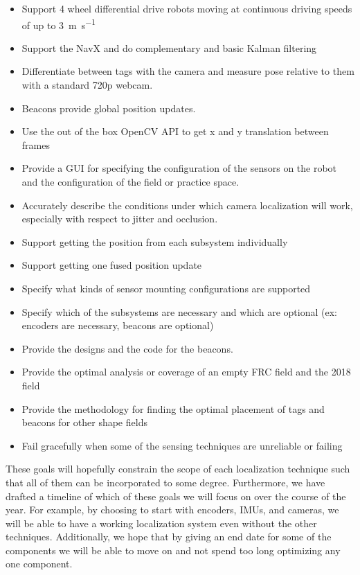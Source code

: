 \documentclass{article}
\begin{document}
    \begin{itemize}
      \item Support 4 wheel differential drive robots moving at continuous driving speeds of up to \SI{3}{\meter\per\second}
      \item Support the NavX and do complementary and basic Kalman filtering
      \item Differentiate between tags with the camera and measure pose relative to them with a standard 720p webcam.
      \item Beacons provide global position updates.
      \item Use the out of the box OpenCV API to get x and y translation between frames
      \item Provide a GUI for specifying the configuration of the sensors on the robot and the configuration of the field or practice space.
      \item Accurately describe the conditions under which camera localization will work, especially with respect to jitter and occlusion.
      \item Support getting the position from each subsystem individually
      \item Support getting one fused position update
      \item Specify what kinds of sensor mounting configurations are supported
      \item Specify which of the subsystems are necessary and which are optional (ex: encoders are necessary, beacons are optional)
      \item Provide the designs and the code for the beacons.
      \item Provide the optimal analysis or coverage of an empty FRC field and the 2018 field
      \item Provide the methodology for finding the optimal placement of tags and beacons for other shape fields
      \item Fail gracefully when some of the sensing techniques are unreliable or failing
    \end{itemize}

    These goals will hopefully constrain the scope of each localization technique such that all of them can be incorporated to some degree. Furthermore, we have drafted a timeline of which of these goals we will focus on over the course of the year. For example, by choosing to start with encoders, IMUs, and cameras, we will be able to have a working localization system even without the other techniques. Additionally, we hope that by giving an end date for some of the components we will be able to move on and not spend too long optimizing any one component.
\end{document}
